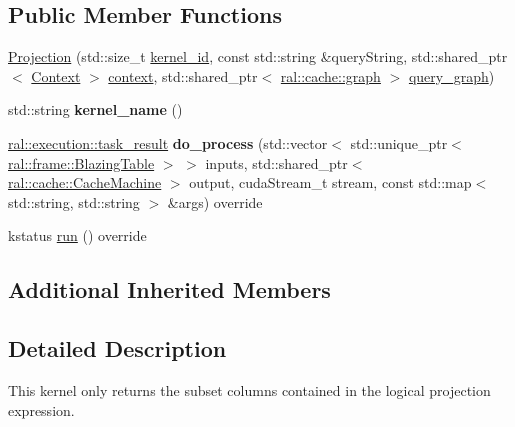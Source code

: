 \subsection*{Public Member Functions}
\begin{DoxyCompactItemize}
\item 
\hyperlink{classral_1_1batch_1_1Projection_a1a13e4b65e633ffc98ad26f1db81e25b}{Projection} (std\+::size\+\_\+t \hyperlink{classral_1_1cache_1_1kernel_a2fd708656cb056a41ec635b8bdc4acfe}{kernel\+\_\+id}, const std\+::string \&query\+String, std\+::shared\+\_\+ptr$<$ \hyperlink{classblazingdb_1_1manager_1_1Context}{Context} $>$ \hyperlink{classral_1_1cache_1_1kernel_af0347d14d678cfa7205c1387746a2e1b}{context}, std\+::shared\+\_\+ptr$<$ \hyperlink{classral_1_1cache_1_1graph}{ral\+::cache\+::graph} $>$ \hyperlink{classral_1_1cache_1_1kernel_a5fbb02292aff165a28ef25e75f0d89bd}{query\+\_\+graph})
\item 
\mbox{\label{classral_1_1batch_1_1Projection_a0490f13d3b3bb26d97b3ddbe9e320a72}} 
std\+::string {\bfseries kernel\+\_\+name} ()
\item 
\mbox{\label{classral_1_1batch_1_1Projection_a538dd2c138364bd16d6e530a9af2a819}} 
\hyperlink{structral_1_1execution_1_1task__result}{ral\+::execution\+::task\+\_\+result} {\bfseries do\+\_\+process} (std\+::vector$<$ std\+::unique\+\_\+ptr$<$ \hyperlink{classral_1_1frame_1_1BlazingTable}{ral\+::frame\+::\+Blazing\+Table} $>$ $>$ inputs, std\+::shared\+\_\+ptr$<$ \hyperlink{classral_1_1cache_1_1CacheMachine}{ral\+::cache\+::\+Cache\+Machine} $>$ output, cuda\+Stream\+\_\+t stream, const std\+::map$<$ std\+::string, std\+::string $>$ \&args) override
\item 
kstatus \hyperlink{classral_1_1batch_1_1Projection_a14bafcd753d4bd86160bec679ac19058}{run} () override
\end{DoxyCompactItemize}
\subsection*{Additional Inherited Members}


\subsection{Detailed Description}
This kernel only returns the subset columns contained in the logical projection expression. 

